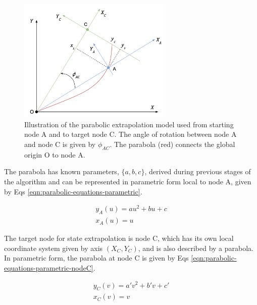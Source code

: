 \begin{figure}[htbp]
    \centering
    \includegraphics[width=0.65\textwidth]{images/6-trackml/extrapolation-model-xy-trackml-2.png}
    \caption{Illustration of the parabolic extrapolation model used from starting node A and to target node C. The angle of rotation between node A and node C is given by $\phi_{AC}$. The parabola (red) connects the global origin O to node A.}
    \label{fig:trackml-parabolic-extrapolation-model-xy}%
\end{figure}

The parabola has known parameters, $\{a, b, c\}$, derived during previous stages of the algorithm and can be represented in parametric form local to node A, given by Eqs \eqref{eqn:parabolic-equations-parametric}.

\begin{equation}
\begin{aligned}
y_A(u) = au^{2} + bu + c \\
x_A(u) = u
\end{aligned}
\label{eqn:parabolic-equations-parametric}
\end{equation}



The target node for state extrapolation is node C, which has its own local coordinate system given by axis $(X_C, Y_C)$, and is also described by a parabola. In parametric form, the parabola at node C is given by Eqs \eqref{eqn:parabolic-equations-parametric-nodeC}.

\begin{equation}
\begin{aligned}
y_C(v) = a'v^{2} + b'v + c' \\
x_C(v) = v
\end{aligned}
\label{eqn:parabolic-equations-parametric-nodeC}
\end{equation}

